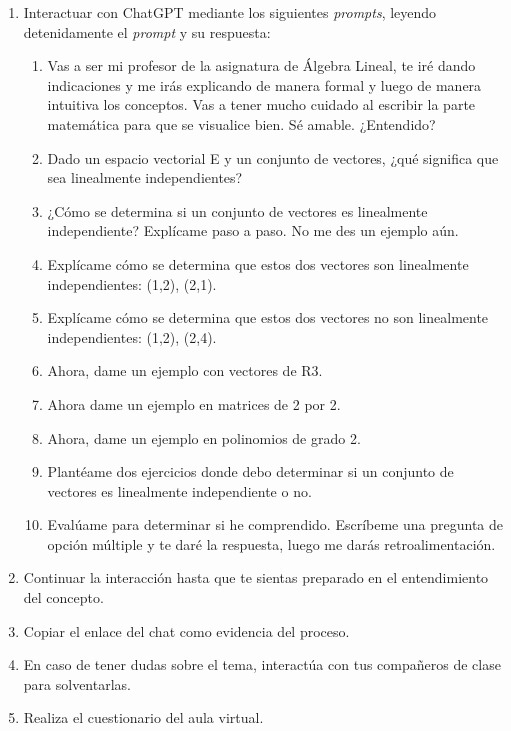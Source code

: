 \documentclass[a4,11pt]{aleph-notas}
\begin{document}
\begin{enumerate}[leftmargin=*]
    \item Interactuar con ChatGPT mediante los siguientes \textit{prompts}, leyendo detenidamente el \textit{prompt} y su respuesta:
    \begin{enumerate}[label=\textit{Prompt \arabic*.},leftmargin=2.1cm]
        \item Vas a ser mi profesor de la asignatura de Álgebra Lineal, te iré dando indicaciones y me irás explicando de manera formal y luego de manera intuitiva los conceptos. Vas a tener mucho cuidado al escribir la parte matemática para que se visualice bien. Sé amable. ¿Entendido?
        \item Dado un espacio vectorial E y un conjunto de vectores, ¿qué significa que sea linealmente independientes?
        \item ¿Cómo se determina si un conjunto de vectores es linealmente independiente? Explícame paso a paso. No me des un ejemplo aún.
        \item Explícame cómo se determina que estos dos vectores son linealmente independientes: (1,2), (2,1). 
        \item Explícame cómo se determina que estos dos vectores no son linealmente independientes: (1,2), (2,4). 
        \item Ahora, dame un ejemplo con vectores de R3.
        \item Ahora dame un ejemplo en matrices de 2 por 2.
        \item Ahora, dame un ejemplo en polinomios de grado 2.
        \item Plantéame dos ejercicios donde debo determinar si un conjunto de vectores es linealmente independiente o no.
        \item Evalúame para determinar si he comprendido. Escríbeme una pregunta de opción múltiple y te daré la respuesta, luego me darás retroalimentación.
    \end{enumerate}
    \item Continuar la interacción hasta que te sientas preparado en el entendimiento del concepto.
    \item Copiar el enlace del chat como evidencia del proceso.
    \item En caso de tener dudas sobre el tema, interactúa con tus compañeros de clase para solventarlas.
    \item Realiza el cuestionario del aula virtual.
\end{enumerate}
\end{document}
